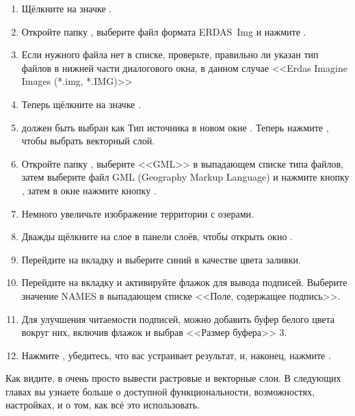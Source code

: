{\setlength{\baselineskip}{1.3\baselineskip}
\begin{enumerate}[itemsep=2pt]
\item Щёлкните на значке .
\item Откройте папку , выберите файл
формата ERDAS~Img  и нажмите .
\item Если нужного файла нет в списке, проверьте, правильно ли указан
тип файлов в нижней части диалогового окна, в данном случае
<<Erdas Imagine Images (*.img, *.IMG)>>
\item Теперь щёлкните на значке .
\item {} должен быть выбран как Тип источника в
новом окне . Теперь нажмите ,
чтобы выбрать векторный слой.
\item Откройте папку , выберите <<GML>>
в выпадающем списке типа файлов, затем выберите файл GML (Geography Markup
Language)  и нажмите кнопку , затем в окне
 нажмите кнопку .
\item Немного увеличьте изображение территории с озерами.
\item Дважды щёлкните на слое  в панели слоёв, чтобы открыть
окно .
\item Перейдите на вкладку  и выберите синий в качестве
цвета заливки.
\item Перейдите на вкладку  и активируйте флажок
 для вывода подписей. Выберите значение
NAMES в выпадающем списке <<Поле, содержащее подпись>>.
\item Для улучшения читаемости подписей, можно добавить буфер белого
цвета вокруг них, включив флажок  и
выбрав <<Размер буфера>> 3.
\item Нажмите , убедитесь, что вас устраивает результат, и,
наконец, нажмите .
\end{enumerate}
\par}
Как видите, в \qg очень просто вывести растровые и векторные слои. В следующих
главах вы узнаете больше о доступной функциональности, возможностях, настройках,
и о том, как всё это использовать.

\FloatBarrier

